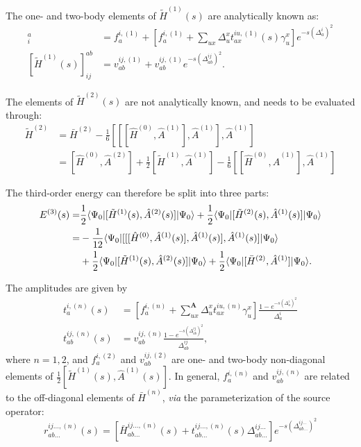 \documentclass{article}
\begin{document}
The one- and two-body elements of $\tilde{H}^{(1)}(s)$ are analytically known as:
\begin{align}
    [\tilde{H}^{(1)}(s)]^a_i&=f_a^{i,(1)}+\left[ f_a^{i,(1)}+\sum_{ux}\Delta_u^xt_{ax}^{iu,(1)}(s)\gamma_u^x \right]e^{-s(\Delta^i_a)^2}\label{eq:htilde1-1b}\\
    [\tilde{H}^{(1)}(s)]^{ab}_{ij}&=v^{ij,(1)}_{ab}+v^{ij,(1)}_{ab}e^{-s (\Delta_{ab}^{ij})^2 }.\label{eq:htilde1-2b}
\end{align}

The elements of $\tilde{H}^{(2)}(s)$ are not analytically known, and needs to be evaluated through:
\begin{align}
\tilde{H}^{(2)} &= \bar{H}^{(2)} - \frac{1}{6}[[[\hat{H}^{(0)},\hat{A}^{(1)}],\hat{A}^{(1)}],\hat{A}^{(1)}]\\
&=[\hat{H}^{(0)},\hat{A}^{(2)}]+\frac{1}{2}[\tilde{H}^{(1)},\hat{A}^{(1)}] - \frac{1}{6}[[\hat{H}^{(0)},\hat{A}^{(1)}],\hat{A}^{(1)}]
\end{align}

The third-order energy can therefore be split into three parts:
\begin{align}
    E^{(3)}(s)=&\frac{1}{2}\langle\Psi_0|[\tilde{H}^{(1)}(s),\hat{A}^{(2)}(s)]|\Psi_0\rangle +\frac{1}{2}\langle\Psi_0|[\tilde{H}^{(2)}(s),\hat{A}^{(1)}(s)]|\Psi_0\rangle\\
    =&-\frac{1}{12}\langle\Psi_0|[[[\hat{H}^{(0)},\hat{A}^{(1)}(s)],\hat{A}^{(1)}(s)],\hat{A}^{(1)}(s)]|\Psi_0\rangle\label{eq:mrpt3-working}\\
    &+ \frac{1}{2}\langle\Psi_0|[\tilde{H}^{(1)}(s),\hat{A}^{(2)}(s)]|\Psi_0\rangle + \frac{1}{2}\langle\Psi_0|[\bar{H}^{(2)},\hat{A}^{(1)}]|\Psi_0\rangle \nonumber.
\end{align}

The amplitudes are given by
\begin{align}
t_a^{i,(n)}(s) &= \left[f_a^{i,(n)}+\sum_{ux}^{\mathbf{A}}\Delta_u^x t_{ax}^{iu,(n)}\gamma_u^x\right]\frac{1-e^{-s(\Delta_a^i)^2}}{\Delta_a^i}\\
t_{ab}^{ij,(n)}(s) &= v_{ab}^{ij,(n)}\frac{1-e^{-s(\Delta_{ab}^{ij})^2}}{\Delta_{ab}^{ij}},
\end{align}
where $n=1,2$, and $f_a^{i,(2)}$ and $v_{ab}^{ij,(2)}$ are one- and two-body non-diagonal elements of $\frac{1}{2}[\tilde{H}^{(1)}(s),\hat{A}^{(1)}(s)]$. In general, $f_a^{i,(n)}$ and $v_{ab}^{ij,(n)}$ are related to the off-diagonal elements of $\bar{H}^{(n)}$, \textit{via} the parameterization of the source operator:
\begin{equation}
r_{ab\dots}^{ij\dots,(n)}(s)=\left[ \bar{H}_{ab\dots}^{ij\dots,(n)}(s)+t_{ab\dots}^{ij\dots,(n)}(s)\Delta_{ab\dots}^{ij\dots} \right]    e^{-s(\Delta_{ab\dots}^{ij\dots})^2}
\end{equation}
\end{document}
